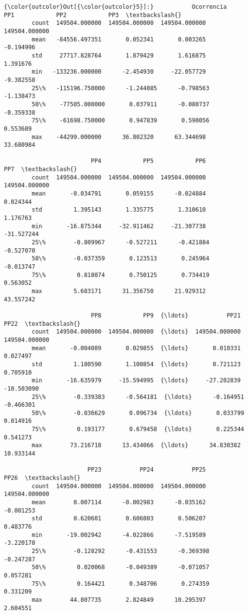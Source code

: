 \documentclass[11pt]{article}
\begin{document}
\begin{Verbatim}[commandchars=\\\{\}]
{\color{outcolor}Out[{\color{outcolor}5}]:}           Ocorrencia            PP1            PP2            PP3  \textbackslash{}
        count  149504.000000  149504.000000  149504.000000  149504.000000   
        mean   -84556.497351       0.052341       0.003265      -0.194996   
        std     27717.828764       1.879429       1.616875       1.391676   
        min   -133236.000000      -2.454930     -22.057729      -9.382558   
        25\%   -115196.750000      -1.244085      -0.798563      -1.138473   
        50\%    -77505.000000       0.037911      -0.080737      -0.359338   
        75\%    -61698.750000       0.947839       0.590056       0.553689   
        max    -44299.000000      36.802320      63.344698      33.680984   
        
                         PP4            PP5            PP6            PP7  \textbackslash{}
        count  149504.000000  149504.000000  149504.000000  149504.000000   
        mean       -0.034791       0.059155      -0.024884       0.024344   
        std         1.395143       1.335775       1.310610       1.176763   
        min       -16.875344     -32.911462     -21.307738     -31.527244   
        25\%        -0.809967      -0.527211      -0.421884      -0.527070   
        50\%        -0.037359       0.123513       0.245964      -0.013747   
        75\%         0.818074       0.750125       0.734419       0.563052   
        max         5.683171      31.356750      21.929312      43.557242   
        
                         PP8            PP9  {\ldots}           PP21           PP22  \textbackslash{}
        count  149504.000000  149504.000000  {\ldots}  149504.000000  149504.000000   
        mean       -0.004089       0.029855  {\ldots}       0.010331       0.027497   
        std         1.180590       1.100854  {\ldots}       0.721123       0.705910   
        min       -16.635979     -15.594995  {\ldots}     -27.202839     -10.503090   
        25\%        -0.339383      -0.564181  {\ldots}      -0.164951      -0.466301   
        50\%        -0.036629       0.096734  {\ldots}       0.033799       0.014916   
        75\%         0.193177       0.679458  {\ldots}       0.225344       0.541273   
        max        73.216718      13.434066  {\ldots}      34.830382      10.933144   
        
                        PP23           PP24           PP25           PP26  \textbackslash{}
        count  149504.000000  149504.000000  149504.000000  149504.000000   
        mean        0.007114      -0.002983      -0.035162      -0.001253   
        std         0.620601       0.606803       0.506207       0.483776   
        min       -19.002942      -4.022866      -7.519589      -3.220178   
        25\%        -0.128292      -0.431553      -0.369398      -0.247287   
        50\%         0.020068      -0.049389      -0.071057       0.057281   
        75\%         0.164421       0.348706       0.274359       0.331209   
        max        44.807735       2.824849      10.295397       2.604551   
        

\end{Verbatim}
\end{document}
